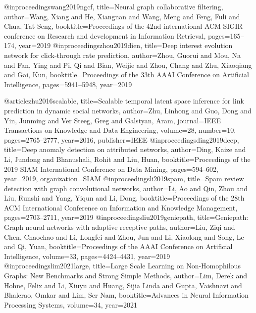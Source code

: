 @inproceedings{wang2019ngcf,
  title={Neural graph collaborative filtering},
  author={Wang, Xiang and He, Xiangnan and Wang, Meng and Feng, Fuli and Chua, Tat-Seng},
  booktitle={Proceedings of the 42nd international ACM SIGIR conference on Research and development in Information Retrieval},
  pages={165--174},
  year={2019}
}
@inproceedings{zhou2019dien,
  title={Deep interest evolution network for click-through rate prediction},
  author={Zhou, Guorui and Mou, Na and Fan, Ying and Pi, Qi and Bian, Weijie and Zhou, Chang and Zhu, Xiaoqiang and Gai, Kun},
  booktitle={Proceedings of the 33th AAAI Conference on Artificial Intelligence},
  pages={5941--5948},
  year={2019}
}

@article{zhu2016scalable,
  title={Scalable temporal latent space inference for link prediction in dynamic social networks},
  author={Zhu, Linhong and Guo, Dong and Yin, Junming and Ver Steeg, Greg and Galstyan, Aram},
  journal={IEEE Transactions on Knowledge and Data Engineering},
  volume={28},
  number={10},
  pages={2765--2777},
  year={2016},
  publisher={IEEE}
}
@inproceedings{ding2019deep,
  title={Deep anomaly detection on attributed networks},
  author={Ding, Kaize and Li, Jundong and Bhanushali, Rohit and Liu, Huan},
  booktitle={Proceedings of the 2019 SIAM International Conference on Data Mining},
  pages={594--602},
  year={2019},
  organization={SIAM}
}
@inproceedings{li2019spam,
  title={Spam review detection with graph convolutional networks},
  author={Li, Ao and Qin, Zhou and Liu, Runshi and Yang, Yiqun and Li, Dong},
  booktitle={Proceedings of the 28th ACM International Conference on Information and Knowledge Management},
  pages={2703--2711},
  year={2019}
}
@inproceedings{liu2019geniepath,
  title={Geniepath: Graph neural networks with adaptive receptive paths},
  author={Liu, Ziqi and Chen, Chaochao and Li, Longfei and Zhou, Jun and Li, Xiaolong and Song, Le and Qi, Yuan},
  booktitle={Proceedings of the AAAI Conference on Artificial Intelligence},
  volume={33},
  pages={4424--4431},
  year={2019}
}
@inproceedings{lim2021large,
  title={Large Scale Learning on Non-Homophilous Graphs: New Benchmarks and Strong Simple Methods},
  author={Lim, Derek and Hohne, Felix and Li, Xiuyu and Huang, Sijia Linda and Gupta, Vaishnavi and Bhalerao, Omkar and Lim, Ser Nam},
  booktitle={Advances in Neural Information Processing Systems},
  volume={34},
  year={2021}
}

